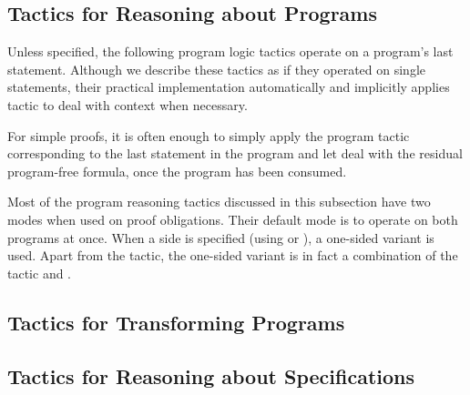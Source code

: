 \subsection{Tactics for Reasoning about Programs}
\label{ReasoningPrograms}

Unless specified, the following program logic tactics operate on a
program's last statement. Although we describe these tactics as if
they operated on single statements, their practical implementation
automatically and implicitly applies tactic  to deal with
context when necessary.

For simple proofs, it is often enough to simply apply the program
tactic corresponding to the last statement in the program and let
 deal with the residual program-free formula, once the program
has been consumed.

Most of the program reasoning tactics discussed in this subsection
have two modes when used on \prhl proof obligations. Their default
mode is to operate on both programs at once. When a side is specified
(using  or ), a one-sided variant
is used. Apart from the  tactic, the one-sided variant is
in fact a combination of the \phl tactic and .

\medskip











\subsection{Tactics for Transforming Programs}
\label{TransformingPrograms}

















\subsection{Tactics for Reasoning about Specifications}

